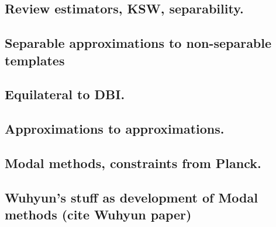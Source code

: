     \subsection{Review estimators, KSW, separability.}
    \subsection{Separable approximations to non-separable templates}
    \subsection{Equilateral to DBI.}
    \subsection{Approximations to approximations.}
    \subsection{Modal methods, constraints from Planck.}
    \subsection{Wuhyun's stuff as development of Modal methods (cite Wuhyun paper)}
